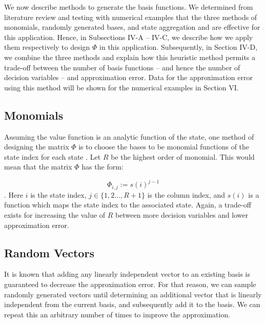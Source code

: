 \documentclass[conference]{IEEEtran}
\begin{document}
We now describe methods to generate the basis functions. We determined from literature review and testing with numerical examples that the three methods of monomials, randomly generated bases, and state aggregation and are effective for this application. Hence, in Subsections IV-A -- IV-C, we describe how we apply them respectively to design $\Phi$ in this application. Subsequently, in Section IV-D, we combine the three methods and explain how this heuristic method permits a trade-off between the number of basis functions -- and hence the number of decision variables -- and approximation error. Data for the approximation error using this method will be shown for the numerical examples in Section VI.

\subsection{Monomials}
    Assuming the value function is an analytic function of the state, one method of designing the matrix $\Phi$ is to choose the bases to be monomial functions of the state index for each state \cite{bertsekas1995dynamic}\cite{478953}. Let $R$ be the highest order of monomial. This would mean that the matrix $\Phi$ has the form:
	
	\begin{displaymath}
        \Phi_{i,j}:=s(i)^{j-1}
    \end{displaymath}. Here $i$ is the state index, $j\in\{1,2...,R+1\}$ is the column index, and $s(i)$ is a function which maps the state index to the associated state. Again, a trade-off exists for increasing the value of $R$ between more decision variables and lower approximation error.
	

\subsection{Random Vectors}
    It is known that adding any linearly independent vector to an existing basis is guaranteed to decrease the approximation error. For that reason, we can sample randomly generated vectors until determining an additional vector that is linearly independent from the current basis, and subsequently add it to the basis. We can repeat this an arbitrary number of times to improve the approximation.
\end{document}
